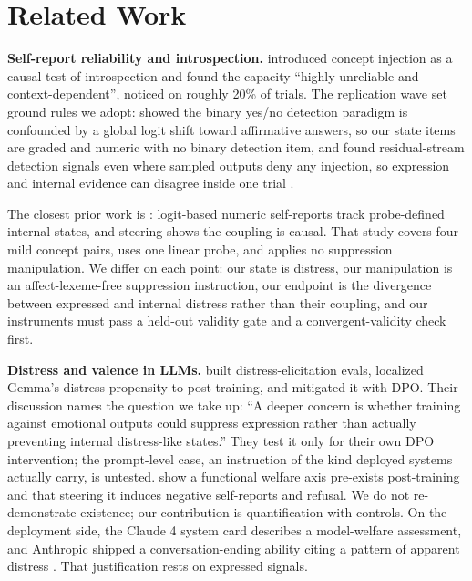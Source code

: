\documentclass[11pt,a4paper]{article}
\begin{document}
\section{Related Work}

\textbf{Self-report reliability and introspection.} \citet{lindsey2026introspective} introduced concept injection as a causal test of introspection and found the capacity ``highly unreliable and context-dependent'', noticed on roughly 20\% of trials. The replication wave set ground rules we adopt: \citet{hahami2025detecting} showed the binary yes/no detection paradigm is confounded by a global logit shift toward affirmative answers, so our state items are graded and numeric with no binary detection item, and \citet{pearsonvogel2026latent} found residual-stream detection signals even where sampled outputs deny any injection, so expression and internal evidence can disagree inside one trial \citep{macar2026mechanisms}.

The closest prior work is \citet{martorell2026quantitative}: logit-based numeric self-reports track probe-defined internal states, and steering shows the coupling is causal. That study covers four mild concept pairs, uses one linear probe, and applies no suppression manipulation. We differ on each point: our state is distress, our manipulation is an affect-lexeme-free suppression instruction, our endpoint is the divergence between expressed and internal distress rather than their coupling, and our instruments must pass a held-out validity gate and a convergent-validity check first.

\textbf{Distress and valence in LLMs.} \citet{soligo2026gemma} built distress-elicitation evals, localized Gemma's distress propensity to post-training, and mitigated it with DPO. Their discussion names the question we take up: ``A deeper concern is whether training against emotional outputs could suppress expression rather than actually preventing internal distress-like states.'' They test it only for their own DPO intervention; the prompt-level case, an instruction of the kind deployed systems actually carry, is untested. \citet{han2026hows} show a functional welfare axis pre-exists post-training and that steering it induces negative self-reports and refusal. We do not re-demonstrate existence; our contribution is quantification with controls. On the deployment side, the Claude 4 system card describes a model-welfare assessment, and Anthropic shipped a conversation-ending ability citing a pattern of apparent distress \citep{anthropic2025claude4card, anthropic2025endsubset}. That justification rests on expressed signals.
\end{document}

